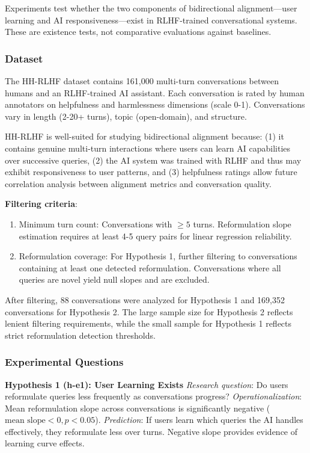 
Experiments test whether the two components of bidirectional alignment---user learning and AI responsiveness---exist in RLHF-trained conversational systems. These are existence tests, not comparative evaluations against baselines.

\subsubsection{Dataset}

The HH-RLHF dataset \citep{bai2022constitutional} contains 161,000 multi-turn conversations between humans and an RLHF-trained AI assistant. Each conversation is rated by human annotators on helpfulness and harmlessness dimensions (scale 0-1). Conversations vary in length (2-20+ turns), topic (open-domain), and structure.

HH-RLHF is well-suited for studying bidirectional alignment because: (1) it contains genuine multi-turn interactions where users can learn AI capabilities over successive queries, (2) the AI system was trained with RLHF and thus may exhibit responsiveness to user patterns, and (3) helpfulness ratings allow future correlation analysis between alignment metrics and conversation quality.

\textbf{Filtering criteria}:
\begin{enumerate}
\item Minimum turn count: Conversations with $\geq 5$ turns. Reformulation slope estimation requires at least 4-5 query pairs for linear regression reliability.
\item Reformulation coverage: For Hypothesis 1, further filtering to conversations containing at least one detected reformulation. Conversations where all queries are novel yield null slopes and are excluded.
\end{enumerate}

After filtering, 88 conversations were analyzed for Hypothesis 1 and 169,352 conversations for Hypothesis 2. The large sample size for Hypothesis 2 reflects lenient filtering requirements, while the small sample for Hypothesis 1 reflects strict reformulation detection thresholds.

\subsubsection{Experimental Questions}

\textbf{Hypothesis 1 (h-e1): User Learning Exists}  
\textit{Research question}: Do users reformulate queries less frequently as conversations progress?  
\textit{Operationalization}: Mean reformulation slope across conversations is significantly negative ($\text{mean slope} < 0, p < 0.05$).  
\textit{Prediction}: If users learn which queries the AI handles effectively, they reformulate less over turns. Negative slope provides evidence of learning curve effects.

